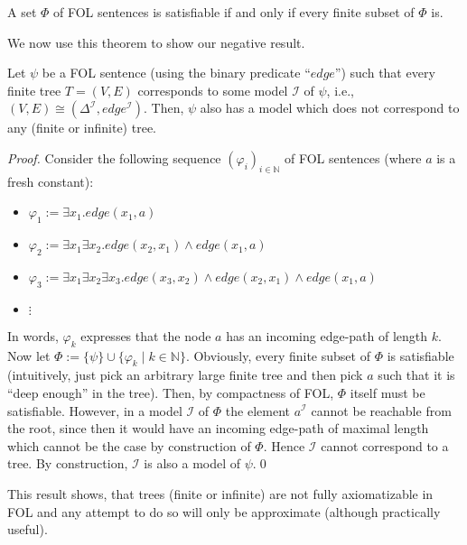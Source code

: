 \begin{theorem}
A set $\Phi$ of FOL sentences is satisfiable if and only if every finite subset of $\Phi$ is.	
\end{theorem}

We now use this theorem to show our negative result.

\begin{proposition}
Let $\psi$ be a FOL sentence (using the binary predicate ``$edge$'') such that every finite tree $T=(V,E)$ corresponds to some model $\mathcal{I}$ of $\psi$, i.e., $(V,E) \cong (\Delta^\mathcal{I},edge^\mathcal{I})$. Then, $\psi$ also has a model which does not correspond to any (finite or infinite) tree.
\end{proposition}

\begin{proof}
Consider the following sequence $(\varphi_i)_{i\in \mathbb{N}}$ of FOL sentences (where $a$ is a fresh constant):
\begin{itemize}
\item[] $\varphi_1 := \exists x_1. edge(x_1,a)$
\item[] $\varphi_2 := \exists x_1 \exists x_2. edge(x_2,x_1) \wedge edge(x_1,a)$
\item[] $\varphi_3 := \exists x_1\exists x_2\exists x_3. edge(x_3,x_2) \wedge edge(x_2,x_1) \wedge edge(x_1,a)$
\item[] $\vdots$
\end{itemize} 

In words, $\varphi_k$ expresses that the node $a$ has an incoming edge-path of length $k$.
Now let $\Phi := \{\psi\} \cup \{\varphi_k \mid k \in \mathbb{N}\}$. Obviously, every finite subset of $\Phi$ is satisfiable (intuitively, just pick an arbitrary large finite tree and then pick $a$ such that it is ``deep enough'' in the tree). Then, by compactness of FOL, $\Phi$ itself must be satisfiable. However, in a model $\mathcal{I}$ of $\Phi$ the element $a^\mathcal{I}$ cannot be reachable from the root, since then it would have an incoming edge-path of maximal length which cannot be the case by construction of $\Phi$. Hence $\mathcal{I}$ cannot correspond to a tree. By construction, $\mathcal{I}$ is also a model of $\psi$.\qed
\end{proof}

This result shows, that trees (finite or infinite) are not fully axiomatizable in FOL and any attempt to do so will only be approximate (although practically useful). 

